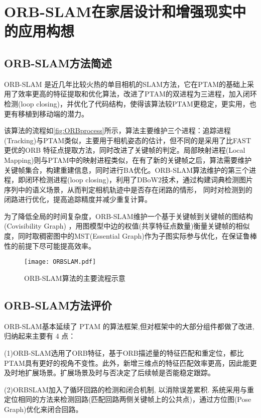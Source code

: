 \chapter{ORB-SLAM在家居设计和增强现实中的应用构想}

\section{ORB-SLAM方法简述}

ORB-SLAM \cite{Mur-Artal2015}
是近几年比较火热的单目相机的SLAM方法，它在PTAM的基础上采用了效率更高的特征提取和优化算法，改进了PTAM的双进程为三进程，加入闭环检测(loop closing)，并优化了代码结构，使得该算法较PTAM更稳定，更实用，也更有移植到移动端的潜力。

该算法的流程如\autoref*{fig:ORBprocess}所示，算法主要维护三个进程：追踪进程(Tracking)与PTAM类似，主要用于相机姿态的估计，但不同的是采用了比FAST更优的ORB \cite{Strasdat2011}
特征点提取方法，同时改进了关键帧的判定。局部映射进程(Local Mapping)则与PTAM中的映射进程类似，在有了新的关键帧之后，算法需要维护关键帧集合，构建重建信息，同时进行BA优化。ORB-SLAM算法维护的第三个进程，即闭环检测进程(loop closing)，利用了DBoW2\cite{Galvez-Lopez2012}技术，通过构建词典检测图片序列中的语义场景，从而判定相机轨迹中是否存在闭路的情形，
同时对检测到的闭路进行优化，提高追踪精度并减少重复计算。

为了降低全局的时间复杂度，ORB-SLAM维护一个基于关键帧到关键帧的图结构(Covisibility Graph)
\cite{Galvez-Lopez2012}
，用图模型中边的权值(共享特征点数量)衡量关键帧的相似度，同时取稠密图中的MST(Essential Graph)作为子图实际参与优化，在保证鲁棒性的前提下尽可能提高效率。


\begin{figure}[!htbp]
\centering
\texttt{[image: ORBSLAM.pdf]}
\caption{ORB-SLAM算法的主要流程示意}
\label{fig:ORBprocess}
\end{figure}

\section{ORB-SLAM方法评价}
ORB-SLAM基本延续了 PTAM 的算法框架,但对框架中的大部分组件都做了改进, 归纳起来主要有 4 点： \cite{刘浩敏2016基于单目视觉的同时定位与地图构建方法综述}

(1)ORB-SLAM选用了ORB特征，基于ORB描述量的特征匹配和重定位，都比PTAM具有更好的视角不变性。此外，新增三维点的特征匹配效率更高，因此能更及时地扩展场景。扩展场景及时与否决定了后续帧是否能稳定跟踪。

(2)ORBSLAM加入了循环回路的检测和闭合机制, 以消除误差累积. 系统采用与重定位相同的方法来检测回路(匹配回路两侧关键帧上的公共点)，通过方位图(Pose Graph)优化来闭合回路。

